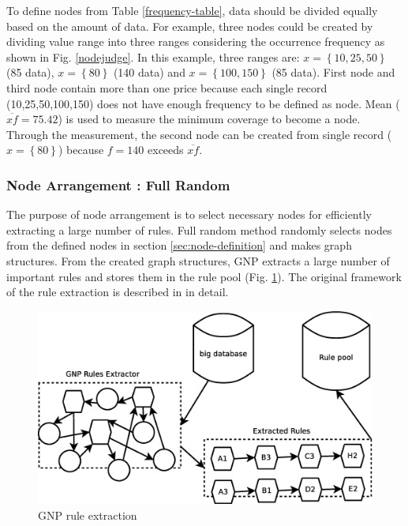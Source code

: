 \documentclass{elsart}
\begin{document}
To define nodes from Table \ref{frequency-table}, data should be divided equally based on the amount of data. For example, three nodes could be created by dividing value range into three ranges considering the occurrence frequency as shown in Fig. \ref{nodejudge}. In this example, three ranges are: $x = \left\{ 10,25,50 \right\} $ (85 data), $x = \left\{ 80 \right\} $ (140 data) and $x = \left\{ 100,150 \right\} $ (85 data). First node and third node contain more than one price because each single record (10,25,50,100,150) does not have enough frequency to be defined as node. Mean ($\overline{xf}=75.42$) is used to measure the minimum coverage to become a node. Through the measurement, the second node can be created from single record ($x = \left\{ 80 \right\} $) because $f=140$ exceeds $\overline{xf}$.

\subsubsection{Node Arrangement : Full Random \label{secfull-random1}}
The purpose of node arrangement is to select necessary nodes for efficiently extracting a large number of rules. Full random method randomly selects nodes from the defined nodes in section \ref{sec:node-definition} and makes graph structures. From the created graph structures, GNP extracts a large number of important rules and stores them in the rule pool (Fig. \ref{gnp_rulepool}). The original framework of the rule extraction is described in \cite{gnp2} in detail.

\begin{figure}[tb]
\begin{center}
\includegraphics[width=12cm]{images/gnp_rulepool}
\caption{\label{gnp_rulepool} GNP rule extraction}
\end{center}
\end{figure}
\end{document}
